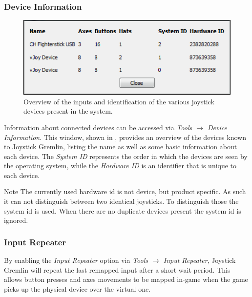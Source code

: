 \documentclass[a4, 10pt]{article}
\newcommand{\JG}{Joystick Gremlin}
\begin{document}
\subsubsection{Device Information}

\begin{figure}[bt]
    \centering

    \includegraphics[width=0.75\linewidth]{images/device_information}
    \caption{Overview of the inputs and identification of the various
        joystick devices present in the system.}
    \label{fig:device_information}
\end{figure}

Information about connected devices can be accessed via \emph{Tools
$\rightarrow$ Device Information}. This window, shown in
, provides an overview of the devices known
to \JG{}, listing the name as well as some basic information about each
device. The \emph{System ID} represents the order in which the devices
are seen by the operating system, while the \emph{Hardware ID} is an
identifier that is unique to each device.

\vspace{1em}
\begin{bclogo}[
    couleur=yellow!40,
    couleurBord=orange!80,
    couleurBarre=orange!80,
    arrondi=0.1,
    logo=\bcinfo
]{Note}
    The currently used hardware id is not device, but product specific.
    As such it can not distinguish between two identical joysticks. To
    distinguish those the system id is used. When there are no duplicate
    devices present the system id is ignored.
\end{bclogo}


\subsubsection{Input Repeater}

By enabling the \emph{Input Repeater} option via \emph{Tools
$\rightarrow$ Input Repeater}, \JG{} will repeat the last remapped input
after a short wait period. This allows button presses and axes movements
to be mapped in-game when the game picks up the physical device over the
virtual one.
\end{document}
